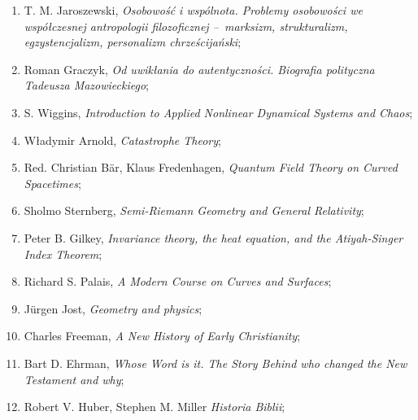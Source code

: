 \documentclass[a4paper,11pt]{article}
\begin{document}
\begin{enumerate}
\item T. M. Jaroszewski, \textit{Osobowość i wspólnota. Problemy
    osobowości we współczesnej antropologii filozoficznej --~marksizm,
    strukturalizm, egzystencjalizm, personalizm chrześcijański};



\item Roman Graczyk, \textit{Od uwikłania do autentyczności. Biografia
    polityczna Tadeusza Mazowieckiego};



\item S. Wiggins, \textit{Introduction to Applied Nonlinear Dynamical
    Systems and Chaos};



\item Władymir Arnold, \textit{Catastrophe Theory};



\item Red. Christian B\"{a}r, Klaus Fredenhagen, \textit{Quantum Field
    Theory on Curved Spacetimes};



\item Sholmo Sternberg, \textit{Semi-Riemann Geometry and General
    Relativity};



\item Peter B. Gilkey, \textit{Invariance theory, the heat equation, and
    the Atiyah-Singer Index Theorem};



\item Richard S. Palais, \textit{A Modern Course on Curves and
    Surfaces};



\item J\"{u}rgen Jost, \textit{Geometry and physics};



\item Charles Freeman, \textit{A New History of Early Christianity};



\item Bart D. Ehrman, \textit{Whose Word is it. The Story Behind who
    changed the New Testament and why};



\item Robert V. Huber, Stephen M. Miller \textit{Historia Biblii};




\end{enumerate}
\end{document}
